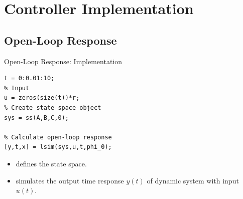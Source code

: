 \section{Controller Implementation}

\subsection{Open-Loop Response}
\begin{frame}[fragile]{Open-Loop Response: Implementation}

\begin{lstlisting}[language=mymatlab]
% Time in seconds
t = 0:0.01:10;
% Input
u = zeros(size(t))*r;
% Create state space object
sys = ss(A,B,C,0);

% Calculate open-loop response
[y,t,x] = lsim(sys,u,t,phi_0);
\end{lstlisting}

\begin{itemize}
    \item {} defines the state space.
    \item {} simulates the output time response $y(t)$ of dynamic system with input $u(t)$.
\end{itemize}
\end{frame}

